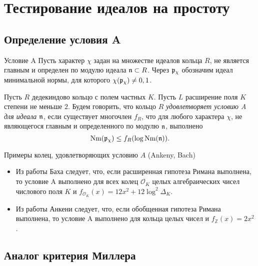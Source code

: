 \documentclass[8pt, xcolor=x11names]{beamer}
\begin{document}
\section{Тестирование идеалов на простоту}

\subsection{Определение условия A}

\begin{frame}
    \begin{block}{Условие A}
        Пусть характер $\chi$ задан на множестве идеалов кольца $R$, не является главным и определен по модулю идеала $\mathfrak{n} \subset R$.
        Через $\mathfrak{p}_{\chi}$ обозначим идеал минимальной нормы, для которого $\chi(\mathfrak{p}_{\chi}) \neq 0, 1$.
    
        Пусть $R$ дедекиндово кольцо с полем частных $K$.
        Пусть $L$ расширение поля $K$ степени не меньше $2$.
        Будем говорить, что кольцо $R$ \emph{удовлетворяет условию A для идеала $\mathfrak{n}$}, если существует многочлен $f_R$, что для любого характера $\chi$, не являющегося главным и определенного по модулю $\mathfrak{n}$, выполнено
        \begin{equation*}
            \textrm{Nm}(\mathfrak{p}_{\chi}) \le f_R(\log{\textrm{Nm}(\mathfrak{n})}).
        \end{equation*}
    \end{block}

    \begin{block}{Примеры колец, удовлетворяющих условию $A$ (Ankeny, Bach)}
        \begin{itemize}
            \item Из работы Баха следует, что, если расширенная гипотеза Римана выполнена, то условие A выполнено для всех колец $\mathcal{O}_K$ целых алгебраических чисел числового поля $K$ и $f_{\mathcal{O}_K}(x) = 12x^2 + 12\log^2 \Delta_{K}$.

            \item Из работы Анкени следует, что, если обобщенная гипотеза Римана выполнена, то условие A выполнено для кольца целых чисел и $f_{\mathbb{Z}}(x) = 2x^2$.
        \end{itemize}
    \end{block}
\end{frame}

\subsection{Аналог критерия Миллера}
\end{document}
